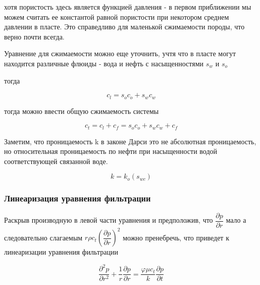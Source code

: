 хотя пористость здесь является функцией давления - в первом приближении мы можем считать ее константой равной пористости при некотором среднем давлении в пласте. Это справедливо для маленькой сжимаемости породы, что верно почти всегда.

Уравнение для сжимаемости можно еще уточнить, учтя что в пласте могут находится различные флюиды - вода и нефть с насыщенностями  $s_w$ и $s_o$

тогда 

$$ c_l = s_o c_o + s_w c_w $$

тогда можно ввести общую сжимаемость системы 

$$ c_t = c_l + c_f = s_o c_o + s_w c_w  + c_f $$ 

Заметим, что проницаемость k в законе Дарси это не абсолютная проницаемость, но относительная проницаемость по нефти при насыщенности водой соответствующей связанной воде.  

$$ k= k_o (s_{wc}) $$

\subsubsection{Линеаризация уравнения фильтрации}

Раскрыв производную в левой части уравнения и предположив, что $\dfrac{\partial p}{\partial r}$ мало а следовательно слагаемым  $ r \rho c_t \left( \dfrac{\partial p}{\partial r} \right)^2 $ можно пренебречь, что приведет к линеаризации уравнения фильтрации

\begin{equation} \label{eq:diff_eq_lin}
\frac{\partial^2 p}{\partial r^2} + \frac{1}{r} \frac{\partial p}{\partial r}= \frac{\varphi \mu c_t}{k} \frac{\partial p}{\partial t}
\end{equation}

